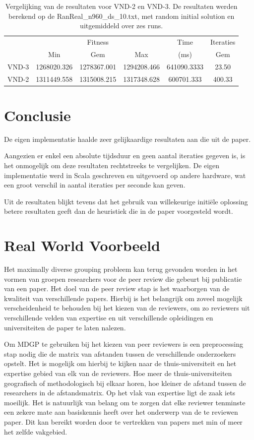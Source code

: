 \documentclass[pdftex,12pt,a4paper]{article}
\begin{document}
\begin{table}[h]
\centering
\begin{tabular}{l|c|c|c|c|c}
& \multicolumn{3}{c|}{Fitness} & Time & Iteraties \\
& Min & Gem & Max & (ms) & Gem \\\hline 
VND-3 & 1268020.326	& 1278367.001 & 1294208.466	& 641090.3333 & 23.50\\
VND-2 & 1311449.558 &	1315008.215 &	1317348.628 &	600701.333 & 400.33
\end{tabular}
\caption{Vergelijking van de resultaten voor VND-2 en VND-3. De resultaten werden berekend op de RanReal\_n960\_ds\_10.txt, met random initial solution en uitgemiddeld over zes runs.}
\label{table:vnd3vsvnd2}
\end{table}

\section{Conclusie}
De eigen implementatie haalde zeer gelijkaardige resultaten aan die uit de paper. 

Aangezien er enkel een absolute tijdsduur en geen aantal iteraties gegeven is, is het onmogelijk om deze resultaten rechtstreeks te vergelijken. De eigen implementatie werd in Scala geschreven en uitgevoerd op andere hardware, wat een groot verschil in aantal iteraties per seconde kan geven.

Uit de resultaten blijkt tevens dat het gebruik van willekeurige initi\"ele oplossing betere resultaten geeft dan de heuristiek die in de paper voorgesteld wordt. 

\section{Real World Voorbeeld}

Het maximally diverse grouping probleem kan terug gevonden worden in het vormen van groepen researchers voor de peer review die gebeurt bij publicatie van een paper. Het doel van de peer review stap is het waarborgen van de kwaliteit van verschillende papers. Hierbij is het belangrijk om zoveel mogelijk verscheidenheid te behouden bij het kiezen van de reviewers, om zo reviewers uit verschillende velden van expertise en uit verschillende opleidingen en universiteiten de paper te laten nalezen.

Om MDGP te gebruiken bij het kiezen van peer reviewers is een preprocessing stap nodig die de matrix van afstanden tussen de verschillende onderzoekers opstelt. Het is mogelijk om hierbij te kijken naar de thuis-universiteit en het expertise gebied van elk van de reviewers. Hoe meer de thuis-universiteiten geografisch of methodologisch bij elkaar horen, hoe kleiner de afstand tussen de researchers in de afstandsmatrix. Op het vlak van expertise ligt de zaak iets moeilijk. Het is natuurlijk van belang om te zorgen dat elke reviewer tenminste een zekere mate aan basiskennis heeft over het onderwerp van de te reviewen paper. Dit kan bereikt worden door te vertrekken van papers met min of meer het zelfde vakgebied.
\end{document}
